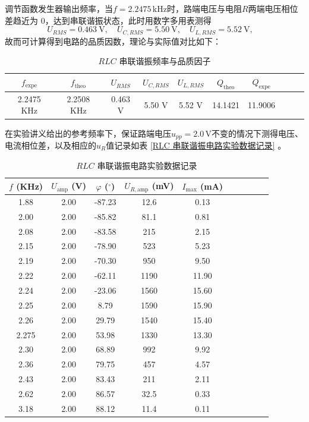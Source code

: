 \documentclass[UTF8]{article}
\theoremstyle{MyLineTheoremStyle} %
\theoremstyle{MyBlockTheoremStyle} %
\theoremstyle{MySubsubsectionStyle} %
\begin{document}
调节函数发生器输出频率，当$ f=2.2475\,\mathrm{kHz} $时，路端电压与电阻$ R $两端电压相位差趋近为 0，达到串联谐振状态，此时用数字多用表测得
\begin{equation}
U_{RMS} = 0.463 \ \mathrm{V},\quad
U_{C, RMS} = 5.50 \ \mathrm{V},\quad 
U_{L, RMS} = 5.52 \ \mathrm{V},\quad
\end{equation}
故而可计算得到电路的品质因数，理论与实际值对比如下：
\begin{table}[H]\centering
    \caption{$ RLC $ 串联谐振频率与品质因子}
\begin{tabular}{cccccccccc}\toprule
    $f_{\text{expe}}$ & $f_{\text{theo}}$ & $U_{RMS}$ & $U_{C, RMS}$ & $U_{L, RMS}$ & $Q_{\text{theo}}$ & $Q_{\text{expe}}$ \\
    \midrule
    2.2475 KHz & 2.2508 KHz &  0.463 V & 5.50 V & 5.52 V & 14.1421 & 11.9006 \\
    \bottomrule
\end{tabular}
\end{table}

在实验讲义给出的参考频率下，保证路端电压$ u_{pp}=2.0\,\mathrm V $不变的情况下测得电压、电流相位差，以及相应的$ u_R $值记录如表 \ref{RLC 串联谐振电路实验数据记录} 。

\begin{table}[H]\centering
    \caption{$ RLC $ 串联谐振电路实验数据记录}
    \label{RLC  串联谐振电路实验数据记录}
\begin{tabular}{cccccccccc}\toprule
    $f$ (KHz) & $U_{\text{amp}}$ (V) & $\varphi$ ($^\circ$) & $U_{R, \text{amp}}$ (mV) & $I_{\max}$ (mA)  \\
    \midrule
    1.88	&2.00	&-87.23	&12.6	&0.13   \\
    2.00	&2.00	&-85.82	&81.1	&0.81   \\
    2.08	&2.00	&-83.58	&215	&2.15   \\
    2.15	&2.00	&-78.90	&523	&5.23   \\
    2.19	&2.00	&-70.30	&950	&9.50   \\
    2.22	&2.00	&-62.11	&1190	&11.90  \\
    2.24	&2.00	&-23.06	&1560	&15.60  \\
    2.25	&2.00	&8.79	&1590	&15.90  \\
    2.26	&2.00	&29.79	&1540	&15.40  \\
    2.275	&2.00	&53.98	&1330	&13.30  \\
    2.30	&2.00	&68.89	&992	&9.92   \\
    2.36	&2.00	&79.75	&457	&4.57   \\
    2.43	&2.00	&83.43	&211	&2.11   \\
    2.62	&2.00	&86.57	&32.5	&0.33   \\
    3.18	&2.00	&88.12	&11.4	&0.11   \\
    \bottomrule
\end{tabular}
\end{table}
\end{document}
